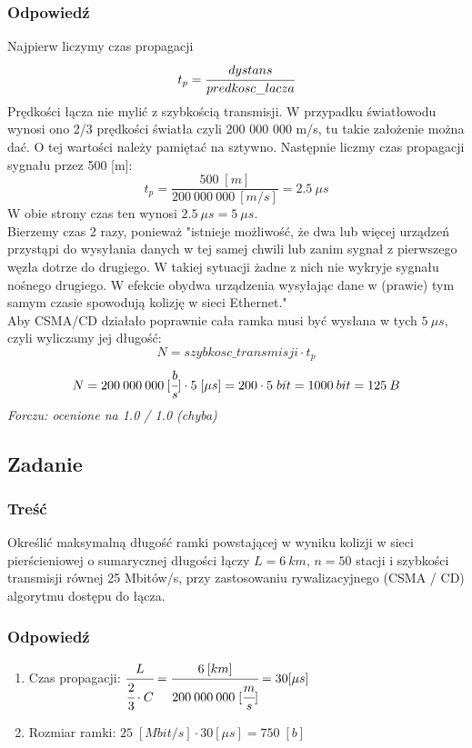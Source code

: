 		\subsubsection{Odpowiedź}
			Najpierw liczymy czas propagacji $$ t_p = \cfrac{dystans}{predkosc\_lacza} $$
			Prędkości łącza nie mylić z szybkością transmisji. W przypadku światłowodu wynosi ono 2/3 prędkości światła czyli 200 000 000 m/s, tu takie założenie można dać. O tej wartości należy pamiętać na sztywno. Następnie liczmy czas propagacji sygnału przez 500 [m]:
			$$ t_p=\frac{500\;[m]}{200\:000\:000\:[m/s]}=2.5\:\mu s $$
			W obie strony czas ten wynosi $ 2.5\:\mu s = 5\:\mu s$.\\
			Bierzemy czas 2 razy, ponieważ "istnieje możliwość, że dwa lub więcej urządzeń przystąpi do wysyłania danych w tej samej chwili lub zanim sygnał z pierwszego węzła dotrze do drugiego. W takiej sytuacji żadne z nich nie wykryje sygnału nośnego drugiego. W efekcie obydwa urządzenia wysyłając dane w (prawie) tym samym czasie spowodują kolizję w sieci Ethernet."\\
			Aby CSMA/CD działało poprawnie cała ramka musi być wysłana w tych $5\:\mu s$, czyli wyliczamy jej długość:
			$$ N=szybkosc\_transmisji\cdot t_p $$
			$$ N=200\:000\:000\:[\cfrac{b}{s}]\cdot5\;[\mu s] =200\cdot5\;bit=1000\:bit=125\:B $$
			{\small \emph{Forczu: ocenione na 1.0 / 1.0 (chyba)}}
			
	\subsection{Zadanie}
		\subsubsection{Treść}
			Określić maksymalną długość ramki powstającej w wyniku kolizji w sieci pierścieniowej o sumarycznej długości łączy $ L=6\:km $, $ n=50 $ stacji i szybkości transmisji równej 25 Mbitów/s, przy zastosowaniu rywalizacyjnego (CSMA / CD) algorytmu dostępu do łącza.
		\subsubsection{Odpowiedź}
		\begin{enumerate}
			\item Czas propagacji: $ \cfrac{L}{\cfrac{2}{3}\cdot C} = \cfrac{6\:[km]}{200\:000\:000\;[\cfrac{m}{s}]}=30 [\mu s]$
			\item Rozmiar ramki: $ 25\;[Mbit/s] \cdot 30 [\mu s]=750\;[b] $
		\end{enumerate}
\newpage
